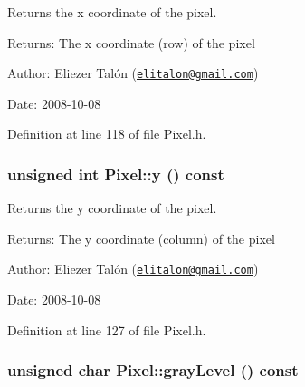 Returns the x coordinate of the pixel. 

\begin{Desc}
\item[Returns:]The x coordinate (row) of the pixel\end{Desc}
\begin{Desc}
\item[Author:]Eliezer Talón (\href{mailto:elitalon@gmail.com}{\tt elitalon@gmail.com}) \end{Desc}
\begin{Desc}
\item[Date:]2008-10-08 \end{Desc}


Definition at line 118 of file Pixel.h.\hypertarget{class_pixel_204cc91a99e1e4f1d96c9cf6caf5747a}{
\subsubsection[y]{\setlength{\rightskip}{0pt plus 5cm}unsigned int Pixel::y () const}}
\label{class_pixel_204cc91a99e1e4f1d96c9cf6caf5747a}


Returns the y coordinate of the pixel. 

\begin{Desc}
\item[Returns:]The y coordinate (column) of the pixel\end{Desc}
\begin{Desc}
\item[Author:]Eliezer Talón (\href{mailto:elitalon@gmail.com}{\tt elitalon@gmail.com}) \end{Desc}
\begin{Desc}
\item[Date:]2008-10-08 \end{Desc}


Definition at line 127 of file Pixel.h.\hypertarget{class_pixel_d82be37dbb53c7ba48c5464b3a3382c6}{
\subsubsection[grayLevel]{\setlength{\rightskip}{0pt plus 5cm}unsigned char Pixel::grayLevel () const}}
\label{class_pixel_d82be37dbb53c7ba48c5464b3a3382c6}


